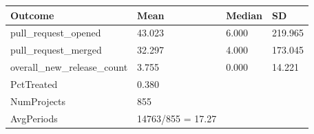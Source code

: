 
\begin{tabular}{llll}
\toprule
Outcome & Mean & Median & SD\\
\midrule
pull\_request\_opened & 43.023 & 6.000 & 219.965\\
pull\_request\_merged & 32.297 & 4.000 & 173.045\\
overall\_new\_release\_count & 3.755 & 0.000 & 14.221\\
\midrule
PctTreated & 0.380 &  &  \\
NumProjects & 855 &  &  \\
AvgPeriods & 14763/855 = 17.27 &  &  \\
\bottomrule
\end{tabular}
